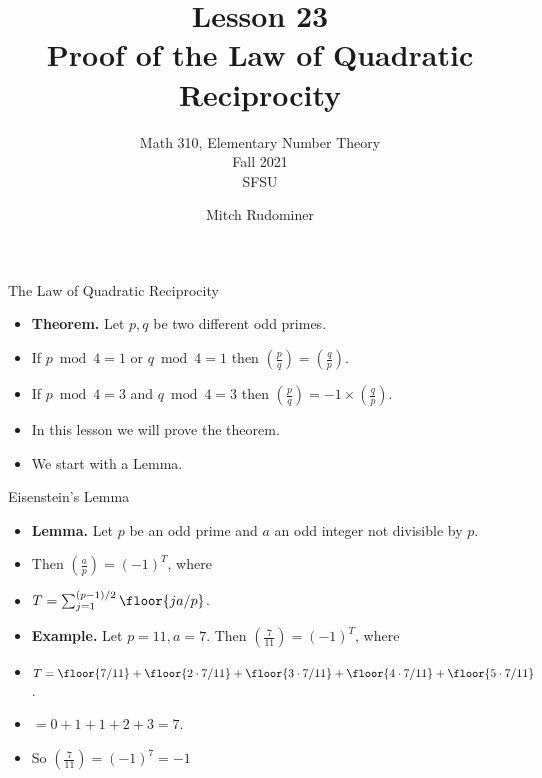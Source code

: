 \documentclass[handout]{beamer}
\title{Lesson 23 \\ Proof of the Law of Quadratic Reciprocity}
\subtitle{Math 310, Elementary Number Theory \\ Fall 2021 \\ SFSU}
\author{Mitch Rudominer}
\date{}
\begin{document}
\begin{frame}
  \titlepage
\end{frame}


\begin{frame}{The Law of Quadratic Reciprocity}

\begin{itemize}
  \item \textbf{Theorem.} Let $p,q$ be two different odd primes.
  \item If $p\bmod 4 = 1$ or $q\bmod 4 = 1$ then $(\frac{p}{q}) = (\frac{q}{p})$.
  \item If $p\bmod 4 = 3$ and $q\bmod 4 = 3$ then $(\frac{p}{q}) = -1 \times (\frac{q}{p})$.
  \item In this lesson we will prove the theorem.
  \item We start with a Lemma.
\end{itemize}
\end{frame}


\begin{frame}{Eisenstein's Lemma}

\begin{itemize}
  \item \textbf{Lemma.} Let $p$ be an odd prime and $a$ an odd integer not divisible by $p$.
  \item Then $\left ( \frac{a}{p}\right) = (-1)^T$, where
  \item $T = \sum_{j=1}^{(p-1)/2} \floor{ja/p}$.
  \item \textbf{Example.} Let $p=11, a=7$. Then $\left ( \frac{7}{11}\right) = (-1)^T$, where
  \item $T = \floor{7/11} + \floor{2\cdot7/11} + \floor{3\cdot7/11}  + \floor{4\cdot7/11}  + \floor{5\cdot7/11}$.
  \item $= 0 + 1 + 1 +2 +3 = 7$.
  \item So  $\left ( \frac{7}{11}\right) = (-1)^7 = -1$
\end{itemize}
\end{frame}

\end{document}
